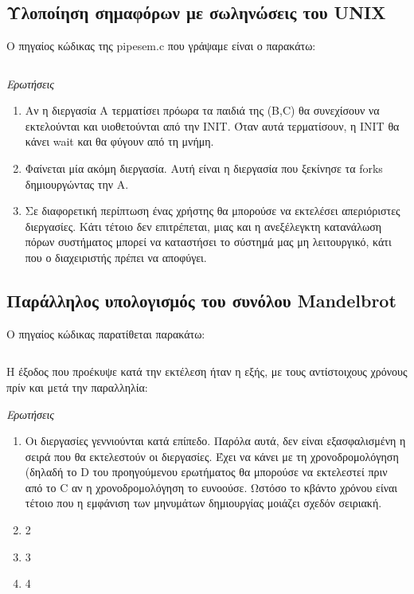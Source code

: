 \documentclass[a4paper,10pt]{article} \usepackage{anysize}
\begin{document}


\section*{} \setcounter{section}{1}
\subsection{Υλοποίηση σημαφόρων με σωληνώσεις του UNIX} 
Ο πηγαίος κώδικας της pipesem.c που γράψαμε είναι ο παρακάτω:
\inputminted[linenos,fontsize=\footnotesize,frame=leftline]{c}{files/pipesem.c}

\emph{Ερωτήσεις}
\begin{enumerate}
\item Αν η διεργασία A τερματίσει πρόωρα τα παιδιά της (B,C) θα συνεχίσουν να
εκτελούνται και υιοθετούνται από την INIT. Όταν αυτά τερματίσουν, η INIT θα
κάνει wait και θα φύγουν από τη μνήμη.
\item Φαίνεται μία ακόμη διεργασία. Αυτή είναι η διεργασία που ξεκίνησε τα
forks δημιουργώντας την A.
\item Σε διαφορετική περίπτωση ένας χρήστης θα μπορούσε να εκτελέσει
απεριόριστες διεργασίες. Κάτι τέτοιο δεν επιτρέπεται, μιας και η ανεξέλεγκτη
κατανάλωση πόρων συστήματος μπορεί να καταστήσει το σύστημά μας μη
λειτουργικό, κάτι που ο διαχειριστής πρέπει να αποφύγει.\\
\end{enumerate}


\subsection{Παράλληλος υπολογισμός του συνόλου Mandelbrot} 
Ο πηγαίος κώδικας παρατίθεται παρακάτω:
\inputminted[linenos,fontsize=\footnotesize,frame=leftline]{c}{files/mandel.c}

Η έξοδος που προέκυψε κατά την εκτέλεση ήταν η εξής, με τους αντίστοιχους χρόνους πρίν και μετά την παραλληλία:

\emph{Ερωτήσεις}
\begin{enumerate}
\item Οι διεργασίες γεννιούνται κατά επίπεδο. Παρόλα αυτά, δεν είναι
εξασφαλισμένη η σειρά που θα εκτελεστούν οι διεργασίες. Έχει να κάνει με τη
χρονοδρομολόγηση (δηλαδή το D του προηγούμενου ερωτήματος θα μπορούσε να
εκτελεστεί πριν από το C αν η χρονοδρομολόγηση το ευνοούσε.
Ωστόσο το κβάντο χρόνου είναι τέτοιο που η εμφάνιση των
μηνυμάτων δημιουργίας μοιάζει σχεδόν σειριακή.
\item 2
\item 3
\item 4
\end{enumerate}
\end{document}
